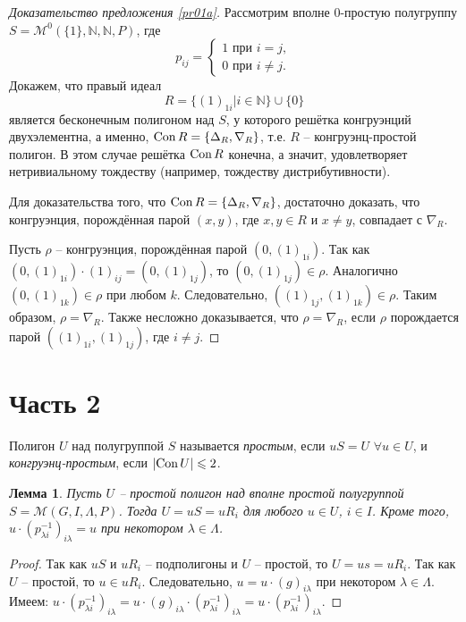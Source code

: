 \documentclass[a4paper]{article}
\newtheorem{lemma}{Лемма}
\newcommand{\Con}{\textnormal{Con}\, }
\begin{document}
	\begin{proof}[Доказательство предложения \ref{pr01a}]
		Рассмотрим вполне 0-простую полугруппу $S = \mathcal{M}^0(\{1\},\mathbb{N},\mathbb{N},P)$, где
		$$ p_{ij} =
			\begin{cases}
				1 \text{ при } i = j,\\
				0 \text{ при } i \neq j.
			\end{cases}
		$$
		Докажем, что правый идеал $$ R = \{ (1)_{1i} | i \in \mathbb{N} \} \cup \{0\} $$ является бесконечным полигоном над $S$, у которого решётка конгруэнций двухэлементна, а именно, $\Con R = \{ \Delta_R, \nabla_R\}$, т.е. $R$ -- конгруэнц-простой полигон. В этом случае решётка $\Con R$ конечна, а значит, удовлетворяет нетривиальному тождеству (например, тождеству дистрибутивности).
		\par Для доказательства того, что $\Con R = \{ \Delta_R, \nabla_R \}$, достаточно доказать, что конгруэнция, порождённая парой $(x,y)$, где $x,y \in R$ и $x \neq y$, совпадает с $\nabla_R$.
		\par Пусть $\rho$ -- конгруэнция, порождённая парой $(0,(1)_{1i})$. Так как $(0,(1)_{1i}) \cdot (1)_{ij} = (0,(1)_{1j})$, то $(0,(1)_{1j}) \in \rho$. Аналогично $(0,(1)_{1k}) \in \rho$ при любом $k$. Следовательно, $((1)_{1j},(1)_{1k}) \in \rho$. Таким образом, $\rho = \nabla_R$. Также несложно доказывается, что $\rho = \nabla_R$, если $\rho$ порождается парой $((1)_{1i},(1)_{1j})$, где $i \neq j$.
	\end{proof}
	\newpage
	\section*{Часть 2}
	Полигон $U$ над полугруппой $S$ называется \textit{простым}, если $uS = U$ $\forall u \in U$, и \textit{конгруэнц-простым}, если $|\Con U| \leqslant 2$.
	\begin{lemma}   \label{l2.1}
		Пусть $U$ -- простой полигон над вполне простой полугруппой $S = \mathcal{M}(G,I,\Lambda,P)$. Тогда $U = uS = u R_i$ для любого $u \in U$, $i \in I$. Кроме того, $u \cdot (p_{\lambda i}^{-1})_{i \lambda} = u$ при некотором $\lambda \in \Lambda$.
	\end{lemma}
	\begin{proof}
		Так как $uS$ и $uR_i$ -- подполигоны и $U$ -- простой, то $U = us = u R_i$. Так как $U$ -- простой, то $u \in u R_i$. Следовательно, $u = u \cdot (g)_{i \lambda}$ при некотором $\lambda \in \Lambda$. Имеем: $u \cdot (p_{\lambda i}^{-1})_{i \lambda} = u \cdot (g)_{i \lambda} \cdot  (p_{\lambda i}^{-1})_{i \lambda} = u \cdot (p_{\lambda i}^{-1})_{i \lambda}$.
	\end{proof}
	
\end{document}
